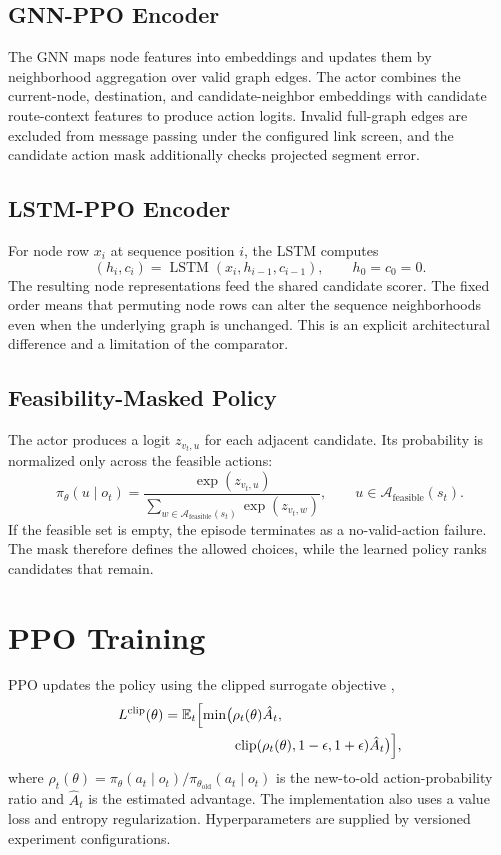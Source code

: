 \documentclass[12pt,a4paper,oneside]{report}
\begin{document}
\subsection{GNN-PPO Encoder}
The GNN maps node features into embeddings and updates them by neighborhood aggregation over valid graph edges. The actor combines the current-node, destination, and candidate-neighbor embeddings with candidate route-context features to produce action logits. Invalid full-graph edges are excluded from message passing under the configured link screen, and the candidate action mask additionally checks projected segment error.

\subsection{LSTM-PPO Encoder}
For node row $x_i$ at sequence position $i$, the LSTM computes
\begin{equation}
(h_i,c_i)=\operatorname{LSTM}(x_i,h_{i-1},c_{i-1}),\qquad h_0=c_0=0.
\label{eq:lstm}
\end{equation}
The resulting node representations feed the shared candidate scorer. The fixed order means that permuting node rows can alter the sequence neighborhoods even when the underlying graph is unchanged. This is an explicit architectural difference and a limitation of the comparator.

\subsection{Feasibility-Masked Policy}
The actor produces a logit $z_{v_t,u}$ for each adjacent candidate. Its probability is normalized only across the feasible actions:
\begin{equation}
\pi_\theta(u\mid o_t)=
\frac{\exp(z_{v_t,u})}
{\sum_{w\in\mathcal{A}_{\mathrm{feasible}}(s_t)}\exp(z_{v_t,w})},
\qquad u\in\mathcal{A}_{\mathrm{feasible}}(s_t).
\label{eq:policy}
\end{equation}
If the feasible set is empty, the episode terminates as a no-valid-action failure. The mask therefore defines the allowed choices, while the learned policy ranks candidates that remain.

\section{PPO Training}
PPO updates the policy using the clipped surrogate objective \cite{schulman2017},
\begin{align}
L^{\mathrm{clip}}(\theta)
=\mathbb{E}_t\Bigl[\min\bigl(&\rho_t(\theta)\hat A_t,\nonumber\\
&\operatorname{clip}(\rho_t(\theta),1-\epsilon,1+\epsilon)\hat A_t\bigr)\Bigr],
\label{eq:ppo}
\end{align}
where $\rho_t(\theta)=\pi_\theta(a_t\mid o_t)/\pi_{\theta_{\mathrm{old}}}(a_t\mid o_t)$ is the new-to-old action-probability ratio and $\hat A_t$ is the estimated advantage. The implementation also uses a value loss and entropy regularization. Hyperparameters are supplied by versioned experiment configurations.
\end{document}
